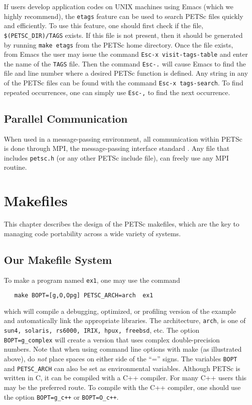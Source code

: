 If users develop application codes on UNIX machines using Emacs (which we
highly recommend), the {\tt etags} feature can be used to search PETSc 
files quickly and efficiently.  To use this feature, one should 
first check if the file,
{\tt \$(PETSC\_DIR)/TAGS} exists.  If this file is
not present, then it should be generated by
running {\tt make etags} from the PETSc home directory. 
Once the file exists, from 
Emacs the user may issue 
the command {\tt Esc-x visit-tags-table} and enter the 
name of the {\tt TAGS} file.  Then the command {\tt Esc-.} will cause Emacs 
to find the file and line number where a desired PETSc function 
is defined.  Any string in any of the PETSc files can be found with the 
command {\tt Esc-x tags-search}. To find repeated occurrences, 
one can simply use {\tt Esc-,} to find the next occurrence.

\section{Parallel Communication}

When used in a message-passing environment, all communication 
within
PETSc is done through MPI, the message-passing interface standard
\cite{MPI-final}.  Any file that includes {\tt petsc.h} (or any other 
PETSc include file), can freely use any MPI routine.

\chapter{Makefiles}
\label{chap:makefile}

This chapter describes the design of the PETSc makefiles, which are the
key to managing code portability across a wide variety of systems.

\section{Our Makefile System}

To make a program named {\tt ex1}, one may use the command
\begin{verbatim}
   make BOPT=[g,O,Opg] PETSC_ARCH=arch  ex1
\end{verbatim}
which will compile a debugging, optimized, or profiling version
of the example and automatically link the appropriate libraries.  The
architecture, {\tt arch}, is one of {\tt sun4, solaris, rs6000, IRIX,
hpux, freebsd}, etc.  The option {\tt BOPT=g\_complex} will
create a version that uses complex double-precision numbers.  Note
that when using command line options with make (as illustrated above),
do {\em not} place spaces on either side of the ``='' signs.
The variables {\tt BOPT} and 
{\tt PETSC\_ARCH} can also be set as environmental
variables.  Although PETSc is written in C, it can be compiled with a 
C++ compiler.  For many C++ users this may be the preferred route. To compile
with the C++ compiler, one should use the option {\tt BOPT=g\_c++} or 
{\tt BOPT=O\_c++}.
  

